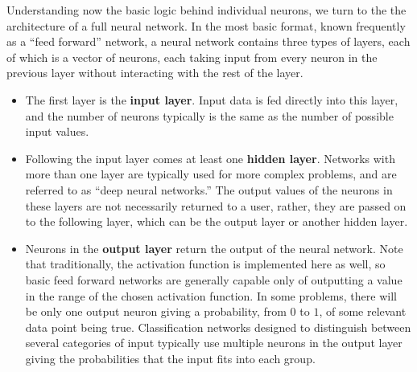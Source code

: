 \documentclass{article}
\begin{document}
Understanding now the basic logic behind individual neurons, we turn to the the architecture of a full neural network. In the most basic format, known frequently as a ``feed forward'' network, a neural network contains three types of layers, each of which is a vector of neurons, each taking input from every neuron in the previous layer without interacting with the rest of the layer.
\begin{itemize}
\item{The first layer is the \textbf{input layer}. Input data is fed directly into this layer, and the number of neurons typically is the same as the number of possible input values.}
\item{Following the input layer comes at least one \textbf{hidden layer}. Networks with more than one layer are typically used for more complex problems, and are referred to as ``deep neural networks.'' The output values of the neurons in these layers are not necessarily returned to a user, rather, they are passed on to the following layer, which can be the output layer or another hidden layer.}
\item{Neurons in the \textbf{output layer} return the output of the neural network. Note that traditionally, the activation function is implemented here as well, so basic feed forward networks are generally capable only of outputting a value in the range of the chosen activation function. In some problems, there will be only one output neuron giving a probability, from $0$ to $1$, of some relevant data point being true. Classification networks designed to distinguish between several categories of input typically use multiple neurons in the output layer giving the probabilities that the input fits into each group.}
\end{itemize}
\end{document}
